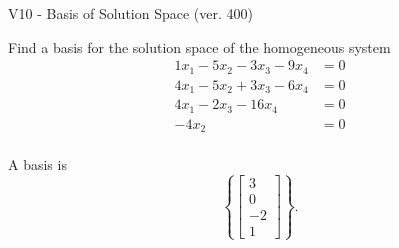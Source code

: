 \begin{exercise}
  \begin{exerciseTitle}V10 - Basis of Solution Space (ver. 400)\end{exerciseTitle}
  \begin{exerciseStatement}
    Find a basis for the solution space of the homogeneous system 
\begin{align*}
 1 x_ 1 -5 x_ 2 -3 x_ 3 -9 x_ 4 &= 0  \\ 
  4 x_ 1 -5 x_ 2 + 3 x_ 3 -6 x_ 4 &= 0  \\ 
  4 x_ 1 -2 x_ 3 -16 x_ 4 &= 0  \\ 
  -4 x_ 2 &= 0  \\ 
 \end{align*}


 
  \end{exerciseStatement}

  \begin{exerciseAnswer}
   A basis is   
\[\left\{\left[\begin{array}{c}
3 \\
0 \\
-2 \\
1
\end{array}\right]\right\}.\]

  


  \end{exerciseAnswer}
\end{exercise}